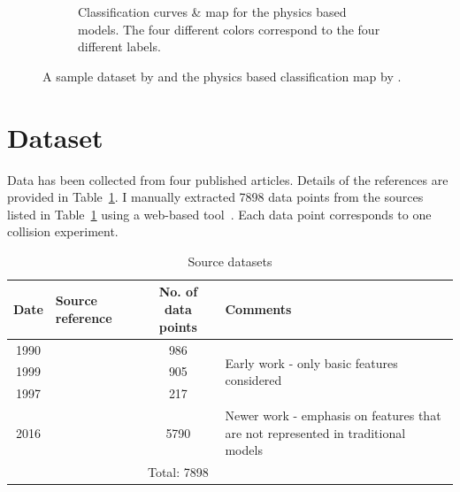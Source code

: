 \documentclass{article}
\begin{document}
\begin{figure}[h!]
\begin{subfigure}[b]{0.45\textwidth}
        \caption{Classification curves \& map for the physics based models. The four different colors correspond to the four different labels.}
        \label{fig:regime}
    \end{subfigure}
    \caption{A sample dataset by \citet{munnannur2007new} and the physics based classification map by \citet{agarwal2019computational}.}
    \label{fig:munnannur}
\end{figure}

\clearpage
\section{Dataset}


Data has been collected from four published articles. Details of the references are provided in Table~\ref{tab:data}. I manually extracted 7898 data points from the sources listed in Table~\ref{tab:data} using a web-based tool~\cite{rohatgi2011webplotdigitizer}. Each data point corresponds to one collision experiment.

\begin{table}[h]
  \caption{Source datasets}
  \label{tab:data}
  \centering
  \begin{tabular}{c l c p{5cm}}
    \toprule
    Date  & Source reference      				& No. of data points  & Comments\\
    \midrule
    1990 & \citet{ashgriz1990coalescence}     		& 986   &  \multirow{3}{5cm}{Early work - only basic features considered} \\
    1999 & \citet{estrade1999experimental} 		& 905   & \\ 
    1997 & \citet{qian1997regimes}    			& 217   & \\
    2016 & \citet{sommerfeld2016modelling}  		& 5790 & Newer work - emphasis on features that are not represented in traditional models\\
    \cmidrule(r){3-3}
             & 									& Total: 7898 & \\
    \bottomrule
  \end{tabular}
\end{table}
\end{document}
